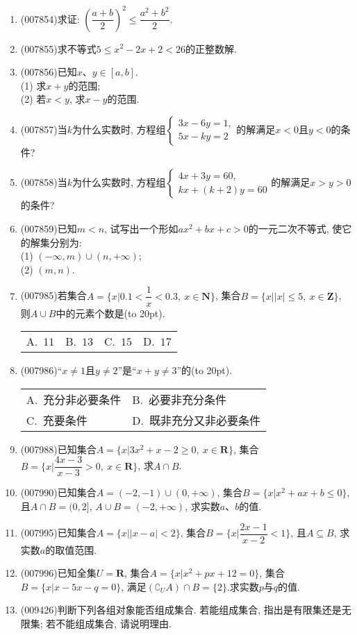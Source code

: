 \documentclass[10pt,a4paper]{article}
\newcommand{\bracket}[1]{(\hbox to #1pt{})}
\newcommand{\twoch}[4]{\par\begin{tabular}{p{.46\textwidth}p{.46\textwidth}}
A.~#1& B.~#2\\
C.~#3& D.~#4
\end{tabular}}
\newcommand{\fourch}[4]{\par\begin{tabular}{p{.23\textwidth}p{.23\textwidth}p{.23\textwidth}p{.23\textwidth}}
A.~#1 &B.~#2& C.~#3& D.~#4
\end{tabular}}
\begin{document}
\begin{enumerate}[1.]
\item {\tiny (007854)}求证: $(\dfrac{a+b}2)^2\le \dfrac{a^2+b^2}2$.
\item {\tiny (007855)}求不等式$5\le x^2-2x+2<26$的正整数解.
\item {\tiny (007856)}已知$x$、$y\in [a,b]$.\\
(1) 求$x+y$的范围;\\
(2) 若$x<y$, 求$x-y$的范围.
\item {\tiny (007857)}当$k$为什么实数时, 方程组$\begin{cases} 3x-6y=1, \\ 5x-ky=2 \end{cases}$的解满足$x<0$且$y<0$的条件?
\item {\tiny (007858)}当$k$为什么实数时, 方程组$\begin{cases} 4x+3y=60, \\ kx+(k+2)y=60 \end{cases}$的解满足$x>y>0$的条件?
\item {\tiny (007859)}已知$m<n$, 试写出一个形如$ax^2+bx+c>0$的一元二次不等式, 使它的解集分别为:\\
(1) $(-\infty ,m)\cup (n,+\infty)$;\\
(2) $(m,n)$.
\item {\tiny (007985)}若集合$A=\{x|0.1<\dfrac 1x<0.3,\ x\in \mathbf{N}\}$, 集合$B=\{x||x|\le 5,\ x\in \mathbf{Z}\}$, 则$A\cup B$中的元素个数是\bracket{20}.
\fourch{$11$}{$13$}{$15$}{$17$}
\item {\tiny (007986)}``$x\ne 1$且$y\ne 2$''是``$x+y\ne 3$''的\bracket{20}.
\twoch{充分非必要条件}{必要非充分条件}{充要条件}{既非充分又非必要条件}
\item {\tiny (007988)}已知集合$A=\{x|3x^2+x-2\ge 0,\  x\in \mathbf{R}\}$, 集合$B=\{x|\dfrac{4x-3}{x-3}>0,\ x\in \mathbf{R}\}$, 求$A\cap B$.
\item {\tiny (007990)}已知集合$A=(-2,-1)\cup (0,+\infty)$, 集合$B=\{x|x^2+ax+b\le 0\}$, 且$A\cap B=(0,2]$, $A\cup B=(-2,+\infty)$, 求实数$a$、$b$的值.
\item {\tiny (007995)}已知集合$A=\{x||x-a|<2\}$, 集合$B=\{x|\dfrac{2x-1}{x-2}<1\}$, 且$A\subseteq B$, 求实数$a$的取值范围.
\item {\tiny (007996)}已知全集$U=\mathbf{R}$, 集合$A=\{x|x^2+px+12=0\}$, 集合$B=\{x|x-5x-q=0\}$, 满足$(\complement _UA)\cap B=\{2\}$.求实数$p$与$q$的值.
\item {\tiny (009426)}判断下列各组对象能否组成集合. 若能组成集合, 指出是有限集还是无限集; 若不能组成集合, 请说明理由.\\

\end{enumerate}
\end{document}
